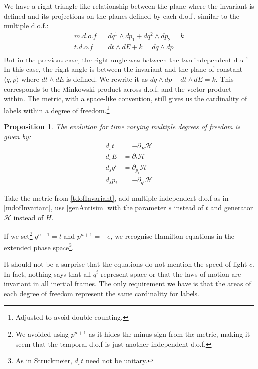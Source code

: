\documentclass[aps,pra,10pt,twocolumn,floatfix,nofootinbib]{revtex4-1}
\newtheorem{prop}[thm]{Proposition}
\theoremstyle{definition}
\begin{document}
We have a right triangle-like relationship between the plane where the invariant is defined and its projections on the planes defined by each d.o.f., similar to the multiple d.o.f.:
\begin{align*}
m.d.o.f \;\;\; &dq^1 \wedge dp_1 + dq^2 \wedge dp_2 = k \\
t.d.o.f \;\;\; &dt \wedge dE + k = dq \wedge dp \\
\end{align*}
But in the previous case, the right angle was between the two independent d.o.f.. In this case, the right angle is between the invariant and the plane of constant $\langle q, p \rangle$ where $dt \wedge dE$ is defined. We rewrite it as $dq \wedge dp - dt \wedge dE = k$. This corresponds to the Minkowski product across d.o.f. and the vector product within. The metric, with a space-like convention, still gives us the cardinality of labels within a degree of freedom.\footnote{Adjusted to avoid double counting.}

\begin{prop}\label{tdofHam}
The evolution for time varying multiple degrees of freedom is given by:
\begin{align*}
d_{s}t &= - \partial_{E} \mathcal{H} \\
d_{s}E &= \partial_{t} \mathcal{H} \\
d_{s}q^i &= \partial_{p_i} \mathcal{H} \\
d_{s}p_i &= - \partial_{q^i} \mathcal{H}
\end{align*}
\end{prop}

Take the metric from \ref{tdofInvariant}, add multiple independent d.o.f as in \ref{mdofInvariant}, use \ref{genAntisim} with the parameter $s$ instead of $t$ and generator $\mathcal{H}$ instead of $H$.

If we set\footnote{We avoided using $p^{n+1}$ as it hides the minus sign from the metric, making it seem that the temporal d.o.f is just another independent d.o.f.} $q^{n+1}=t$ and $p^{n+1}=-e$, we recognise Hamilton equations in the extended phase space\footnote{As in Struckmeier\cite{Struckmeier}, $d_{s}t$ need not be unitary.}\cite{Synge,Lanczos}.

It should not be a surprise that the equations do not mention the speed of light $c$. In fact, nothing says that all $q^i$ represent space or that the laws of motion are invariant in all inertial frames. The only requirement we have is that the areas of each degree of freedom represent the same cardinality for labels.
\end{document}
